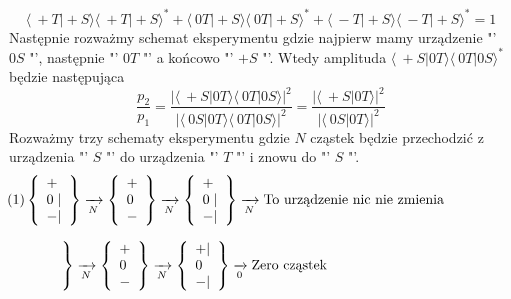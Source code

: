\begin{equation*}
	\langle\ +T\vert+S \rangle \langle\ +T\vert+S \rangle^* + \langle\ 0T\vert+S \rangle \langle\ 0T\vert+S \rangle^* +\langle\ -T\vert+S \rangle \langle\ -T\vert+S \rangle^* =1
\end{equation*}
Następnie rozważmy schemat eksperymentu gdzie najpierw mamy urządzenie "' $0S$ "', następnie "' $0T$ "' a końcowo "' $+S$ "'. Wtedy amplituda $\langle\ +S\vert0T \rangle \langle\ 0T\vert0S \rangle^*$ będzie następująca
\begin{equation*}
	\frac{p_2}{p_1} = \frac{\left|\langle\ +S\vert0T \rangle \langle\ 0T\vert0S \rangle\right|^2}{\left|\langle\ 0S\vert0T \rangle \langle\ 0T\vert0S \rangle\right|^2} = \frac{\left|\langle\ +S\vert0T \rangle\right|^2}{\left|\langle\ 0S\vert0T \rangle\right|^2}
\end{equation*}
Rozważmy trzy schematy eksperymentu gdzie $N$ cząstek będzie przechodzić z urządzenia "' $S$ "' do urządzenia "' $T$ "' i znowu do "' $S$ "'.
\begin{equation*}
	\hspace{-50pt} (1)
	\left\{\begin{array}{lr}
		+ \\
		0 \hspace{3pt} \vert \\
		- \vert
	\end{array}\right\} 
	\xrightarrow[N]{}
	\left\{\begin{array}{lr}
		+  \\
		0  \\
		- 
	\end{array}\right\}
	\xrightarrow[N]{}
	\left\{\begin{array}{lr}
		+  \\
		0 \hspace{3pt} \vert \\
		- \vert
	\end{array}\right\}
	\xrightarrow[N]{} \text{To urządzenie nic nie zmienia}
\end{equation*}

\begin{equation*}
	\hspace{-140pt} (2)
	\left\{\begin{array}{lr}
		+ \\
		0 \hspace{3pt} \vert \\
		- \vert
	\end{array}\right\} 
	\xrightarrow[N]{}
	\left\{\begin{array}{lr}
		+  \\
		0  \\
		- 
	\end{array}\right\}
	\xrightarrow[N]{}
	\left\{\begin{array}{lr}
		+ \vert \\
		0  \\
		- \vert
	\end{array}\right\}
	\xrightarrow[0]{} \text{Zero cząstek}
\end{equation*}

